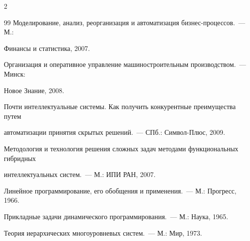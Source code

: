 \begin{multicols}{2}
{{\begin{thebibliography}{99}
Моделирование, анализ, реорганизация и автоматизация биз\-нес-про\-цес\-сов.~--- М.: 


Финансы и статистика, 2007.









Организация и оперативное управление машиностроительным производством.~--- Минск: 


Новое Знание, 2008.









Почти интеллектуальные сис\-те\-мы. Как получить конкурентные преимущества путем 


автоматизации принятия скрытых решений.~--- СПб.: Сим\-вол-Плюс, 2009.












Методология и технология решения сложных задач методами функциональных гибридных 


интеллектуальных систем.~--- М.: ИПИ РАН, 2007.









Линейное программирование, его обобщения и применения.~--- М.: Прогресс, 1966.









Прикладные задачи динамического программирования.~--- М.: Наука, 1965.









Теория иерархических многоуровневых систем.~--- М.: Мир, 1973.









\end{thebibliography}}}
\end{multicols}
